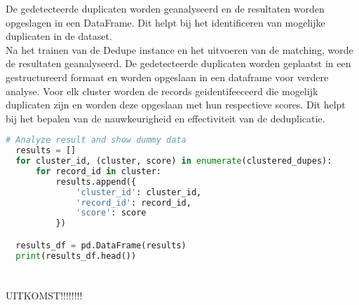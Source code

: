 De gedetecteerde duplicaten worden geanalyseerd en de resultaten worden opgeslagen in een DataFrame. Dit helpt bij het identificeren van mogelijke duplicaten in de dataset. 
\\Na het trainen van de Dedupe instance en het uitvoeren van de matching, worde de resultaten geanalyseerd. De gedetecteerde duplicaten worden geplaatst in een gestructureerd formaat en worden opgeslaan in een dataframe voor verdere analyse. Voor elk cluster worden de records geidentifeeceerd die mogelijk duplicaten zijn en worden deze opgeslaan met hun respectieve scores. Dit helpt bij het bepalen van de nauwkeurigheid en effectiviteit van de deduplicatie.
\begin{lstlisting}[language=Python, caption={Identificeren van mogelijke duplicaten in de dataset}]
  # Analyze result and show dummy data
  results = []
  for cluster_id, (cluster, score) in enumerate(clustered_dupes):
      for record_id in cluster:
          results.append({
              'cluster_id': cluster_id,
              'record_id': record_id,
              'score': score
          })

  results_df = pd.DataFrame(results)
  print(results_df.head())
\end{lstlisting}

\section{}%
\label{sec:analyseResultatenPOC}

UITKOMST!!!!!!!!
